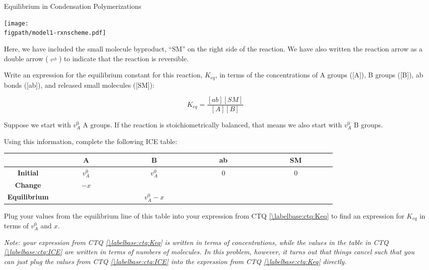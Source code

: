 \begin{activity}{Equilibrium in Condensation Polymerizations}
\begin{model}
		\vspace{0.1in}
		\centerline{\texttt{[image: \\figpath/model1-rxnscheme.pdf]}}
	
	Here, we have included the small molecule byproduct, ``SM'' on the right side of the reaction.
	We have also written the reaction arrow as a double arrow ($\rightleftharpoons$) to indicate that the reaction is reversible.

\end{model}


\begin{ctqs}

	\question \label{\labelbase:ctq:Keq} Write an expression for the equilibrium constant for this reaction, $K_{eq}$, in terms of the concentrations of A groups ([A]), B groups ([B]), ab bonds ([ab]), and released small molecules ([SM]):
	
		\begin{solution}[1in]{}
			\begin{equation*}
				K_{eq} = \frac{[ab][SM]}{[A][B]}
			\end{equation*}
		\end{solution}
	
	\question \label{\labelbase:ctq:ICE} Suppose we start with $v_A^0$ A groups.  If the reaction is stoichiometrically balanced, that means we also start with $v_A^0$ B groups.
	
		Using this information, complete the following ICE table:
		\begin{center}
			\renewcommand{\arraystretch}{4}
			\begin{tabular}{|c|c|c|c|c|}
				\hline
				~ & ~~~~~~~\textbf{A}~~~~~~~ & ~~~~~~~\textbf{B}~~~~~~~ & ~~~~~~~\textbf{ab}~~~~~~~ & ~~~~~~~\textbf{SM}~~~~~~~\\\hline
				\textbf{Initial} & $v_A^0$ & $v_A^0$ & 0 & 0 \\\hline
				\textbf{Change} & $-x$ & \answer{$-x$} & \answer{$+x$} & \answer{$+x$} \\\hline
				\textbf{Equilibrium} & \answer{$v_A^0 - x$} & $v_A^0-x$ & \answer{$x$} & \answer{$x$} \\\hline
			\end{tabular}
		\end{center}
		
	\question Plug your values from the equilibrium line of this table into your expression from CTQ \ref{\labelbase:ctq:Keq} to find an expression for $K_{eq}$ in terms of $v_A^0$ and $x$.
	
		\emph{Note: your expression from CTQ \ref{\labelbase:ctq:Keq} is written in terms of concentrations, while the values in the table in CTQ \ref{\labelbase:ctq:ICE} are written in terms of numbers of molecules.  In this problem, however, it turns out that things cancel such that you can just plug the values from CTQ \ref{\labelbase:ctq:ICE} into the expression from CTQ \ref{\labelbase:ctq:Keq} directly.}
	

\end{ctqs}
\end{activity}
